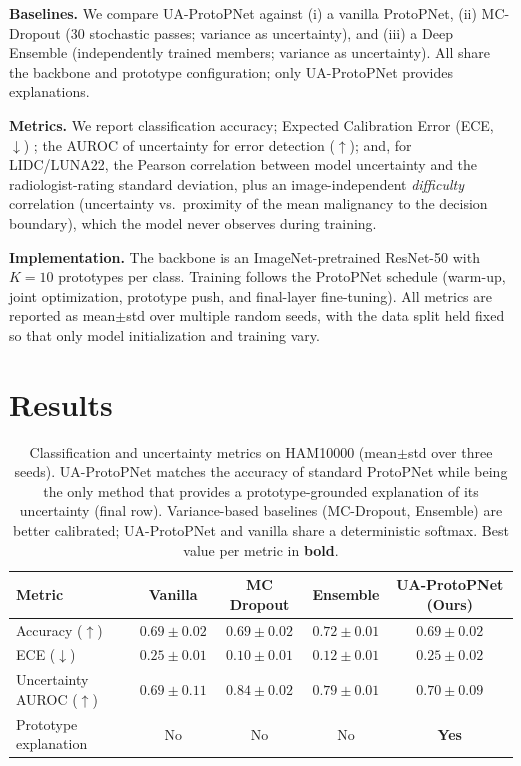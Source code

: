 \documentclass[10pt]{article}
\newcommand{\method}{UA-ProtoPNet}
\begin{document}
\textbf{Baselines.} We compare \method{} against (i) a vanilla ProtoPNet, (ii)
MC-Dropout \parencite{gal2016dropout} ($30$ stochastic passes; variance as
uncertainty), and (iii) a Deep Ensemble \parencite{lakshminarayanan2017ensembles}
(independently trained members; variance as uncertainty). All share the backbone
and prototype configuration; only \method{} provides explanations.

\textbf{Metrics.} We report classification accuracy; Expected Calibration Error
(ECE, $\downarrow$) \parencite{guo2017calibration}; the AUROC of uncertainty for
error detection ($\uparrow$); and, for LIDC/LUNA22, the Pearson correlation
between model uncertainty and the radiologist-rating standard deviation, plus an
image-independent \emph{difficulty} correlation (uncertainty vs.\ proximity of
the mean malignancy to the decision boundary), which the model never observes
during training.

\textbf{Implementation.} The backbone is an ImageNet-pretrained ResNet-50 with
$K{=}10$ prototypes per class. Training follows the ProtoPNet schedule
(warm-up, joint optimization, prototype push, and final-layer fine-tuning). All
metrics are reported as mean$\pm$std over multiple random seeds, with the data
split held fixed so that only model initialization and training vary.


\section{Results}
\label{sec:results}

\begin{table}[!htbp]\centering
\caption{Classification and uncertainty metrics on HAM10000 (mean$\pm$std over
three seeds). \method{} matches the accuracy of standard ProtoPNet while being
the only method that provides a prototype-grounded explanation of its
uncertainty (final row). Variance-based baselines (MC-Dropout, Ensemble) are
better calibrated; \method{} and vanilla share a deterministic softmax. Best
value per metric in \textbf{bold}.}
\label{tab:main}
\begin{tabular}{l cccc}
\hline
\textbf{Metric} & \textbf{Vanilla} & \textbf{MC Dropout} & \textbf{Ensemble}
  & \textbf{\method{} (Ours)} \\
\hline
Accuracy ($\uparrow$)          & $0.69{\pm}0.02$ & $0.69{\pm}0.02$ & $\mathbf{0.72{\pm}0.01}$ & $0.69{\pm}0.02$ \\
ECE ($\downarrow$)             & $0.25{\pm}0.01$ & $\mathbf{0.10{\pm}0.01}$ & $0.12{\pm}0.01$ & $0.25{\pm}0.02$ \\
Uncertainty AUROC ($\uparrow$) & $0.69{\pm}0.11$ & $\mathbf{0.84{\pm}0.02}$ & $0.79{\pm}0.01$ & $0.70{\pm}0.09$ \\
Prototype explanation          & No & No & No & \textbf{Yes} \\
\hline
\end{tabular}
\end{table}
\end{document}
